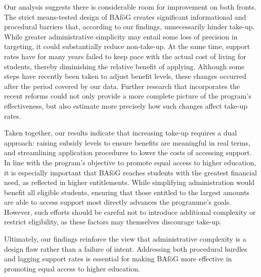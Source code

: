 Our analysis suggests there is considerable room for improvement on both fronts. 
The strict means-tested design of BAföG creates significant informational and procedural barriers that, according to our findings, unnecessarily hinder take-up.
While greater administrative simplicity may entail some loss of precision in targeting, it could substantially reduce non-take-up. 
At the same time, support rates have for many years failed to keep pace with the actual cost of living for students, thereby diminishing the relative benefit of applying. 
Although some steps have recently been taken to adjust benefit levels, these changes occurred after the period covered by our data. 
Further research that incorporates the recent reforms could not only provide a more complete picture of the program’s effectiveness, but also estimate more precisely how such changes affect take-up rates.

Taken together, our results indicate that increasing take-up requires a dual approach: raising subsidy levels to ensure benefits are meaningful in real terms, and streamlining application procedures to lower the costs of accessing support. In line with the program's objective to promote equal access to higher education, it is especially important that BAföG reaches students with the greatest financial need, as reflected in higher entitlements. While simplifying administration would benefit all eligible students, ensuring that those entitled to the largest amounts are able to access support most directly advances the programme’s goals. However, such efforts should be careful not to introduce additional complexity or restrict eligibility, as these factors may themselves discourage take-up.

Ultimately, our findings reinforce the view that administrative complexity is a design flaw rather than a failure of intent. Addressing both procedural hurdles and lagging support rates is essential for making BAföG more effective in promoting equal access to higher education.
